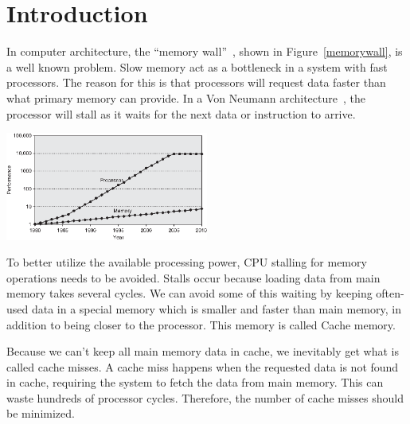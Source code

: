 \section{Introduction} %


In computer architecture, the ``memory wall''~\cite{wulf_mckee_1995},
shown in Figure~\ref{memorywall}, is a well known problem. Slow memory
act as a bottleneck in a system with fast processors. The reason for
this is that processors will request data faster than what primary
memory can provide. In a Von Neumann architecture~\cite{von1993first},
the processor will stall as it waits for the next data or instruction
to arrive.

\begin{center}
  \includegraphics[width=0.5\textwidth]{graphs/memorywall}
  \label{memorywall}
\end{center}

To better utilize the available processing power, CPU stalling for
memory operations needs to be avoided. Stalls occur because loading
data from main memory takes several cycles. We can avoid some of this
waiting by keeping often-used data in a special memory which is
smaller and faster than main memory, in addition to being closer to
the processor. This memory is called Cache memory.

Because we can't keep all main memory data in cache, we inevitably get
what is called cache misses. A cache miss happens when the requested
data is not found in cache, requiring the system to fetch the data
from main memory. This can waste hundreds of processor cycles. Therefore, the
number of cache misses should be minimized.


